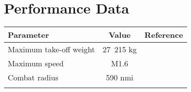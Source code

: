 \section{Performance Data}

\begin{tabularx}{\textwidth}{ | L | c | c | }
  \hline
  \textbf{Parameter}        & \textbf{Value} & \textbf{Reference} \\ \hline
  Maximum take-off weight   & 27~215 kg      & \cite{Janes20072008} \\ \hline
  Maximum speed             & M1.6           & \cite{Janes20072008} \\ \hline
  Combat radius             & 590 nmi        & \cite{Janes20072008} \\ \hline
  \caption{Performance data}
\end{tabularx}
